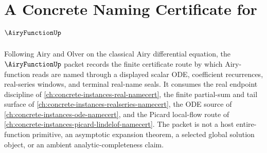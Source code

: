 \chapter{A Concrete Naming Certificate for $\AiryFunctionUp$}
\label{ch:concrete-instances-airy-function-namecert}

Following Airy and Olver on the classical Airy differential equation, the $\AiryFunctionUp$ packet records the finite certificate route by which Airy-function reads are named through a displayed scalar ODE, coefficient recurrences, real-series windows, and terminal real-name seals. It consumes the real endpoint discipline of \autoref{ch:concrete-instances-real-namecert}, the finite partial-sum and tail surface of \autoref{ch:concrete-instances-realseries-namecert}, the ODE source of \autoref{ch:concrete-instances-ode-namecert}, and the Picard local-flow route of \autoref{ch:concrete-instances-picard-lindelof-namecert}. The packet is not a host entire-function primitive, an asymptotic expansion theorem, a selected global solution object, or an ambient analytic-completeness claim.


